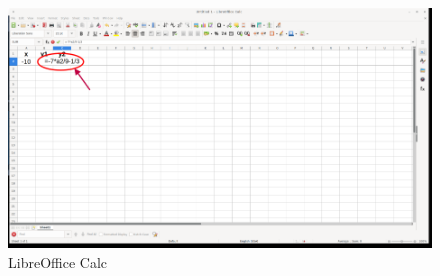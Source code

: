 \begin{figure}[h!]		
	\centering
   	\includegraphics[width=8.0in]{pictures/picture_006.png}
  	\caption{LibreOffice Calc}
   	\label{fig:LibreOfficeCalc006}
\end{figure}